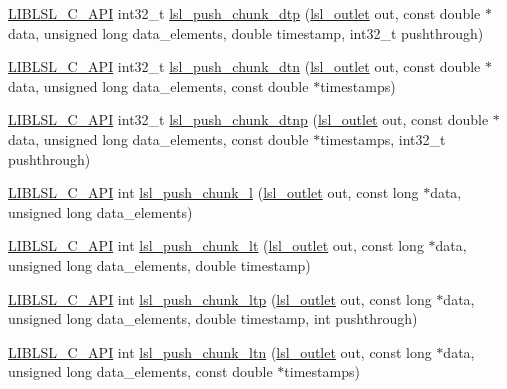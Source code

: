 \begin{DoxyCompactItemize}
\item 
\hyperlink{lsl__cpp_8h_aafd0ef1813e8be84a1420c4f1df64615}{L\+I\+B\+L\+S\+L\+\_\+\+C\+\_\+\+A\+PI} int32\+\_\+t \hyperlink{namespacelsl_afdd8325060d14312cb340bc2edcac10a}{lsl\+\_\+push\+\_\+chunk\+\_\+dtp} (\hyperlink{namespacelsl_abcf512b0f66dacf86c10b165995fd50b}{lsl\+\_\+outlet} out, const double $\ast$data, unsigned long data\+\_\+elements, double timestamp, int32\+\_\+t pushthrough)
\item 
\hyperlink{lsl__cpp_8h_aafd0ef1813e8be84a1420c4f1df64615}{L\+I\+B\+L\+S\+L\+\_\+\+C\+\_\+\+A\+PI} int32\+\_\+t \hyperlink{namespacelsl_ae0a8ffad75240ca3d702944ebf7d7d53}{lsl\+\_\+push\+\_\+chunk\+\_\+dtn} (\hyperlink{namespacelsl_abcf512b0f66dacf86c10b165995fd50b}{lsl\+\_\+outlet} out, const double $\ast$data, unsigned long data\+\_\+elements, const double $\ast$timestamps)
\item 
\hyperlink{lsl__cpp_8h_aafd0ef1813e8be84a1420c4f1df64615}{L\+I\+B\+L\+S\+L\+\_\+\+C\+\_\+\+A\+PI} int32\+\_\+t \hyperlink{namespacelsl_a8a0e5cfc6b88e4dae3d4abd97ac47c38}{lsl\+\_\+push\+\_\+chunk\+\_\+dtnp} (\hyperlink{namespacelsl_abcf512b0f66dacf86c10b165995fd50b}{lsl\+\_\+outlet} out, const double $\ast$data, unsigned long data\+\_\+elements, const double $\ast$timestamps, int32\+\_\+t pushthrough)
\item 
\hyperlink{lsl__cpp_8h_aafd0ef1813e8be84a1420c4f1df64615}{L\+I\+B\+L\+S\+L\+\_\+\+C\+\_\+\+A\+PI} int \hyperlink{namespacelsl_a68403934d1fdace37348c95f54367bc2}{lsl\+\_\+push\+\_\+chunk\+\_\+l} (\hyperlink{namespacelsl_abcf512b0f66dacf86c10b165995fd50b}{lsl\+\_\+outlet} out, const long $\ast$data, unsigned long data\+\_\+elements)
\item 
\hyperlink{lsl__cpp_8h_aafd0ef1813e8be84a1420c4f1df64615}{L\+I\+B\+L\+S\+L\+\_\+\+C\+\_\+\+A\+PI} int \hyperlink{namespacelsl_a55622b4fc53149f986414f7642baf00a}{lsl\+\_\+push\+\_\+chunk\+\_\+lt} (\hyperlink{namespacelsl_abcf512b0f66dacf86c10b165995fd50b}{lsl\+\_\+outlet} out, const long $\ast$data, unsigned long data\+\_\+elements, double timestamp)
\item 
\hyperlink{lsl__cpp_8h_aafd0ef1813e8be84a1420c4f1df64615}{L\+I\+B\+L\+S\+L\+\_\+\+C\+\_\+\+A\+PI} int \hyperlink{namespacelsl_a1a6be2ac3bc8a1df1f4c08d0b3a79445}{lsl\+\_\+push\+\_\+chunk\+\_\+ltp} (\hyperlink{namespacelsl_abcf512b0f66dacf86c10b165995fd50b}{lsl\+\_\+outlet} out, const long $\ast$data, unsigned long data\+\_\+elements, double timestamp, int pushthrough)
\item 
\hyperlink{lsl__cpp_8h_aafd0ef1813e8be84a1420c4f1df64615}{L\+I\+B\+L\+S\+L\+\_\+\+C\+\_\+\+A\+PI} int \hyperlink{namespacelsl_a93cfea6f1ecc01606e6e4f37bba7103f}{lsl\+\_\+push\+\_\+chunk\+\_\+ltn} (\hyperlink{namespacelsl_abcf512b0f66dacf86c10b165995fd50b}{lsl\+\_\+outlet} out, const long $\ast$data, unsigned long data\+\_\+elements, const double $\ast$timestamps)

\end{DoxyCompactItemize}
